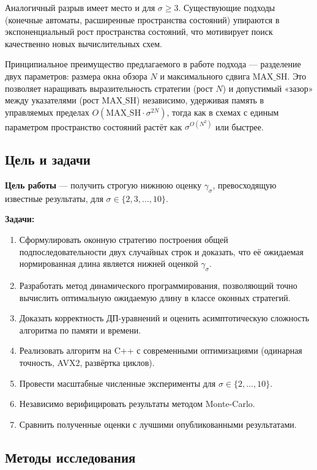 Аналогичный разрыв имеет место и для $\sigma \geq 3$. Существующие подходы (конечные автоматы, расширенные пространства состояний) упираются в экспоненциальный рост пространства состояний, что мотивирует поиск качественно новых вычислительных схем.

Принципиальное преимущество предлагаемого в работе подхода --- разделение двух параметров: размера окна обзора $N$ и максимального сдвига $\mathrm{MAX\_SH}$. Это позволяет наращивать выразительность стратегии (рост $N$) и допустимый «зазор» между указателями (рост $\mathrm{MAX\_SH}$) независимо, удерживая память в управляемых пределах $O(\mathrm{MAX\_SH} \cdot \sigma^{2N})$, тогда как в схемах с единым параметром пространство состояний растёт как $\sigma^{O(N^2)}$ или быстрее.

\subsection*{Цель и задачи}

\textbf{Цель работы} --- получить строгую нижнюю оценку $\gamma_\sigma$, превосходящую известные результаты, для $\sigma \in \{2, 3, \ldots, 10\}$.

\textbf{Задачи:}
\begin{enumerate}
    \item Сформулировать оконную стратегию построения общей подпоследовательности двух случайных строк и доказать, что её ожидаемая нормированная длина является нижней оценкой $\gamma_\sigma$.
    \item Разработать метод динамического программирования, позволяющий точно вычислить оптимальную ожидаемую длину в классе оконных стратегий.
    \item Доказать корректность ДП-уравнений и оценить асимптотическую сложность алгоритма по памяти и времени.
    \item Реализовать алгоритм на C++ с современными оптимизациями (одинарная точность, AVX2, развёртка циклов).
    \item Провести масштабные численные эксперименты для $\sigma \in \{2, \ldots, 10\}$.
    \item Независимо верифицировать результаты методом Monte-Carlo.
    \item Сравнить полученные оценки с лучшими опубликованными результатами.
\end{enumerate}

\subsection*{Методы исследования}

